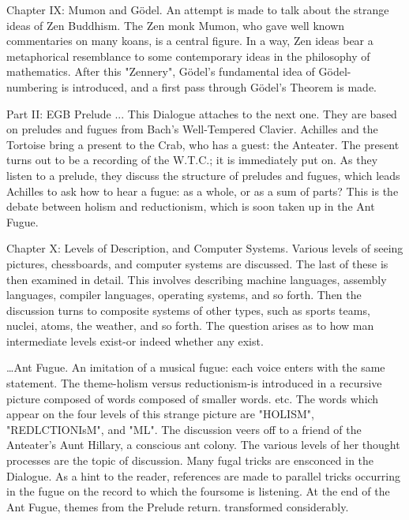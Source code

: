 Chapter IX: Mumon and Gödel. An attempt is made to talk about the strange ideas of Zen
  Buddhism. The Zen monk Mumon, who gave well known commentaries on many koans, is a
  central figure. In a way, Zen ideas bear a metaphorical resemblance to some contemporary ideas
  in the philosophy of mathematics. After this "Zennery", Gödel’s fundamental idea of Gödel-
  numbering is introduced, and a first pass through Gödel’s Theorem is made.

                                         Part II: EGB
Prelude ... This Dialogue attaches to the next one. They are based on preludes and fugues from
   Bach's Well-Tempered Clavier. Achilles and the Tortoise bring a present to the Crab, who has a
   guest: the Anteater. The present turns out to be a recording of the W.T.C.; it is immediately put
   on. As they listen to a prelude, they discuss the structure of preludes and fugues, which leads
   Achilles to ask how to hear a fugue: as a whole, or as a sum of parts? This is the debate between
   holism and reductionism, which is soon taken up in the Ant Fugue.

Chapter X: Levels of Description, and Computer Systems. Various levels of seeing pictures,
  chessboards, and computer systems are discussed. The last of these is then examined in detail.
  This involves describing machine languages, assembly languages, compiler languages, operating
  systems, and so forth. Then the discussion turns to composite systems of other types, such as
  sports teams, nuclei, atoms, the weather, and so forth. The question arises as to how man
  intermediate levels exist-or indeed whether any exist.





   …Ant Fugue. An imitation of a musical fugue: each voice enters with the same statement. The
   theme-holism versus reductionism-is introduced in a recursive picture composed of words
   composed of smaller words. etc. The words which appear on the four levels of this strange picture
   are "HOLISM", "REDLCTIONIsM", and "ML". The discussion veers off to a friend of the
   Anteater's Aunt Hillary, a conscious ant colony. The various levels of her thought processes are
   the topic of discussion. Many fugal tricks are ensconced in the Dialogue. As a hint to the reader,
   references are made to parallel tricks occurring in the fugue on the record to which the foursome
   is listening. At the end of the Ant Fugue, themes from the Prelude return. transformed
   considerably.

